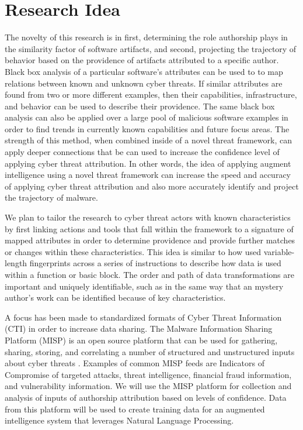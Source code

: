 \documentclass[12pt]{report}
\begin{document}
\section{Research Idea}
The novelty of this research is in first, determining the role authorship plays in the similarity factor of software artifacts, and second, projecting the trajectory of behavior based on the providence of artifacts attributed to a specific author.  Black box analysis of a particular software's attributes can be used to to map relations between known and unknown cyber threats.  If similar attributes are found from two or more different examples, then their capabilities, infrastructure, and behavior can be used to describe their providence.  The same black box analysis can also be applied over a large pool of malicious software examples in order to find trends in currently known capabilities and future focus areas.  The strength of this method, when combined inside of a novel threat framework, can apply deeper connections that be can used to increase the confidence level of applying cyber threat attribution.  In other words, the idea of applying augment intelligence using a novel threat framework can increase the speed and accuracy of applying cyber threat attribution and also more accurately identify and project the trajectory of malware.

We plan to tailor the research to cyber threat actors with known characteristics by first linking actions and tools that fall within the framework to a signature of mapped attributes in order to determine providence and provide further matches or changes within these characteristics.  This idea is similar to how \cite{oh2009fight} used variable-length fingerprints across a series of instructions to describe how data is used within a function or basic block.  The order and path of data transformations are important and uniquely identifiable, such as in the same way that an mystery author's work can be identified because of key characteristics.  

A focus has been made to standardized formats of Cyber Threat Information (CTI) in order to increase data sharing.  The Malware Information Sharing Platform (MISP) is an open source platform that can be used for gathering, sharing, storing, and correlating a number of structured and unstructured inputs about cyber threats \cite{MISP}.  Examples of common MISP feeds are Indicators of Compromise of targeted attacks, threat intelligence, financial fraud information, and vulnerability information.  We will use the MISP platform for collection and analysis of inputs of authorship attribution based on levels of confidence.  Data from this platform will be used to create training data for an augmented intelligence system that leverages Natural Language Processing.
\end{document}
